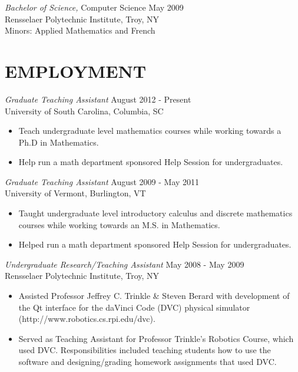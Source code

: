 \documentclass[line,overlapped]{res}
\begin{document}
\begin{resume}
          {\sl Bachelor of Science,} Computer Science \hfill May 2009\\
          Rensselaer Polytechnic Institute, Troy, NY\\
          Minors: Applied Mathematics and French

          \section{EMPLOYMENT}
                  {\sl Graduate Teaching Assistant} \hfill August 2012 - Present \\
                  University of South Carolina, Columbia, SC
                  \begin{itemize}  \itemsep -2pt %
                  \item
                    Teach undergraduate level mathematics courses while working towards a Ph.D in Mathematics.
                  \item 
                    Help run a math department sponsored Help Session for undergraduates.
                  \end{itemize}
                  
                  {\sl Graduate Teaching Assistant} \hfill August 2009 - May 2011 \\
                  University of Vermont, Burlington, VT
                  \begin{itemize}  \itemsep -2pt %
                  \item
                    Taught undergraduate level introductory calculus and discrete mathematics courses while working towards an M.S. in Mathematics.
                  \item 
                    Helped run a math department sponsored Help Session for undergraduates.
                  \end{itemize}

                  {\sl Undergraduate Research/Teaching Assistant} \hfill May 2008 - May 2009 \\
                  Rensselaer Polytechnic Institute, Troy, NY
                  \begin{itemize}  \itemsep -2pt %
                  \item Assisted Professor Jeffrey C. Trinkle \& Steven Berard with development of the Qt interface for the daVinci Code (DVC) physical simulator\\ (http://www.robotics.cs.rpi.edu/dvc).
                  \item Served as Teaching Assistant for Professor Trinkle's Robotics Course, which used DVC.
                    Responsibilities included teaching students how to use the software and designing/grading homework assignments that used DVC.
                  \end{itemize}


\end{resume}
\end{document}

